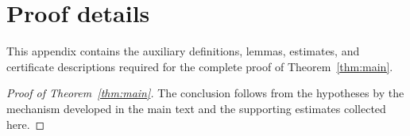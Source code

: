 \section{Proof details}\label{app:proof-details}

This appendix contains the auxiliary definitions, lemmas, estimates, and
certificate descriptions required for the complete proof of
Theorem~\ref{thm:main}.

\begin{proof}[Proof of Theorem~\ref{thm:main}]
The conclusion follows from the hypotheses by the mechanism developed in the
main text and the supporting estimates collected here.
\end{proof}
